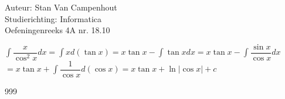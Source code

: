 \documentclass[a4paper]{article}
\begin{document}
  
\noindent \large Auteur: Stan Van Campenhout \\
\noindent \large Studierichting:  Informatica\\
\noindent \large Oefeningenreeks 4A nr. 18.10\\

\medskip

\normalsize

$ \displaystyle\int\dfrac{x}{\cos^2x}dx = \displaystyle\int xd\left(\tan x\right) = x\tan x - \displaystyle\int \tan xdx =  x\tan x - \displaystyle\int \dfrac{\sin x}{\cos x} dx $\\

$ = x\tan x + \displaystyle\int \dfrac{1}{\cos x} d\left(\cos x\right) = x\tan x + \ln|\cos x| + c $\\

\begin{thebibliography}{999}
\end{thebibliography}
\end{document}
